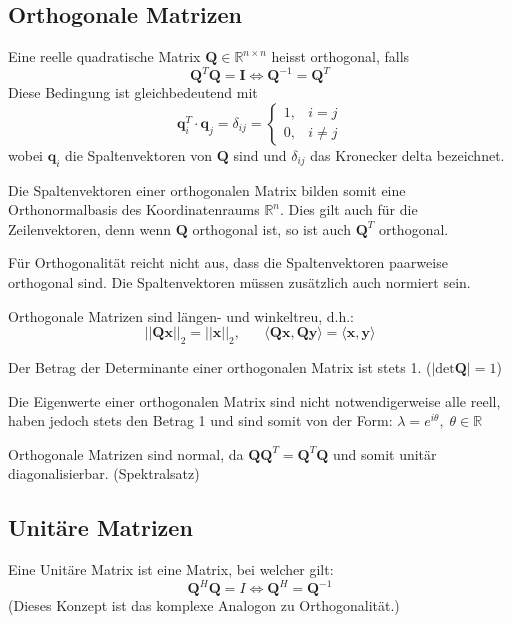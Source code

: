\documentclass[11pt]{article}
\begin{document}
\subsection*{Orthogonale Matrizen}
\vspace*{-0.5cm}
Eine reelle quadratische Matrix $\mathbf{Q} \in \mathbb{R}^{n \times n}$ heisst orthogonal, falls
$$\mathbf{Q}^T \mathbf{Q}= \mathbf{I} \Leftrightarrow \mathbf{Q}^{-1} = \mathbf{Q}^T$$
Diese Bedingung ist gleichbedeutend mit $$\mathbf{q}_i^T \cdot \mathbf{q}_j = \delta_{ij} = \begin{cases}
    1, & i = j \\
    0, & i \neq j
\end{cases}$$
wobei $\mathbf{q}_i$ die Spaltenvektoren von $\mathbf{Q}$ sind und $\delta_{ij}$ das Kronecker delta bezeichnet.

Die Spaltenvektoren einer orthogonalen Matrix bilden somit eine Orthonormalbasis des Koordinatenraums $\mathbb{R}^n$. Dies gilt auch für die Zeilenvektoren, denn wenn $\mathbf{Q}$ orthogonal ist, so ist auch $\mathbf{Q}^T$ orthogonal.

Für Orthogonalität reicht nicht aus, dass die Spaltenvektoren paarweise orthogonal sind. Die Spaltenvektoren müssen zusätzlich auch normiert sein.

Orthogonale Matrizen sind längen- und winkeltreu, d.h.:
$$||\mathbf{Qx}||_2 = ||\mathbf{x}||_2, \hspace{20pt} \langle \mathbf{Qx}, \mathbf{Qy} \rangle = \langle \mathbf{x}, \mathbf{y}\rangle$$

Der Betrag der Determinante einer orthogonalen Matrix ist stets 1. ($|\text{det}\mathbf{Q}| = 1$)

Die Eigenwerte einer orthogonalen Matrix sind nicht notwendigerweise alle reell, haben jedoch stets den Betrag 1 und sind somit von der Form: $\lambda = e^{i\theta}, \; \theta \in \mathbb{R}$

Orthogonale Matrizen sind normal, da $\mathbf{QQ}^T = \mathbf{Q}^T \mathbf{Q}$ und somit unitär diagonalisierbar. (Spektralsatz)

\subsection*{Unitäre Matrizen}
\vspace*{-0.5cm}
Eine Unitäre Matrix ist eine Matrix, bei welcher gilt:
$$\mathbf{Q}^H \mathbf{Q} = I \Leftrightarrow \mathbf{Q}^H = \mathbf{Q}^{-1}$$
(Dieses Konzept ist das komplexe Analogon zu Orthogonalität.)
\end{document}
